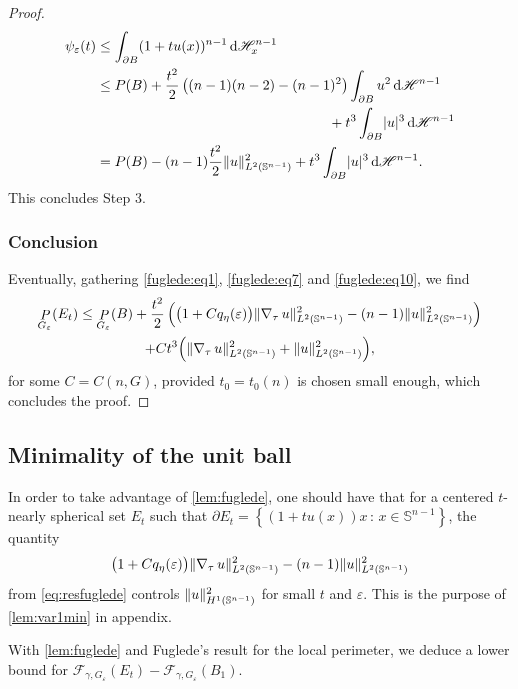 \documentclass[JEP,XML,SOM,Unicode,published]{cedram}
\newcommand{\sep}{\,:\,}
\numberwithin{equation}{section}
\theoremstyle{plain}
\theoremstyle{definition}
\newcommand{\dH}{\mathop{}\mathopen{}\mathrm{d}\mathscr{H}}
\newcommand{\bbS}{\mathbb{S}}
\newcommand{\calF}{{\mathcal{F}}}
\let\eps\varepsilon
\newcommand{\grad}{\nabla}
\DeclareMathOperator{\Per}{\mathit{P}}
\DeclarePairedDelimiter{\abs}{\lvert}{\rvert}
\DeclarePairedDelimiter{\norm}{\lVert}{\rVert}
\begin{document}
\begin{proof}
\begin{equation}\label{fuglede:eq10}
\begin{aligned}
\psi_\eps(t)
&\leq\int_{\partial B} (1+tu(x))^{n-1}\dH_x^{n-1}\\
&\leq \begin{multlined}[t]
P(B)+\frac{t^2}{2}\left((n-1)(n-2)-(n-1)^2\right)\int_{\partial B}
u^2\dH^{n-1}\\
+t^3\int_{\partial B} \abs{u}^3\dH^{n-1}\end{multlined}\\
&= P(B)-(n-1)\frac{t^2}{2}\norm{u}_{L^2(\bbS^{n-1})}^2+t^3\int_{\partial B} \abs{u}^3\dH^{n-1}.
\end{aligned}
\end{equation}
This concludes Step 3.

\subsubsection*{Conclusion}
Eventually, gathering \cref{fuglede:eq1}, \cref{fuglede:eq7} and \cref{fuglede:eq10}, we
find
\begin{multline*}
\Per_{G_\eps}(E_t)
\leq \Per_{G_\eps}(B)+\frac{t^2}{2}\left(\big(1+Cq_\eta(\eps)\big)
\norm{\grad_\tau\,u}_{L^2(\bbS^{n-1})}^2-(n-1)\norm{u}_{L^2(\bbS^{n-1})}^2\right)\\
+Ct^3\Bigl(\norm{\grad_\tau\,u}_{L^2(\bbS^{n-1})}^2+\norm{u}_{L^2(\bbS^{n-1})}^2 \Bigr),
\end{multline*}
for some $C=C(n,G)$, provided $t_0=t_0(n)$ is chosen small enough, which concludes the proof.
\end{proof}

\subsection{Minimality of the unit ball}

In order to take advantage of \cref{lem:fuglede}, one should have that for a centered $t$-nearly
spherical set $E_t$ such that $\partial E_t=\left\{(1+tu(x))x\sep x\in\bbS^{n-1}\right\}$, the
quantity
\[
\big(1+Cq_\eta(\eps)\big)\norm{\grad_\tau\,u}_{L^2(\bbS^{n-1})}^2-(n-1)\norm{u}_{L^2(\bbS^{n-1})}^2
\]
from \cref{eq:resfuglede} controls $\norm{u}_{H^1(\bbS^{n-1})}^2$ for small $t$ and $\eps$. This is
the purpose of \cref{lem:var1min} in appendix.

With \cref{lem:fuglede} and Fuglede's result for the local perimeter, we deduce a lower
bound for $\calF_{\gamma,G_\eps}(E_t)-\calF_{\gamma,G_\eps}(B_1)$.
\end{document}
